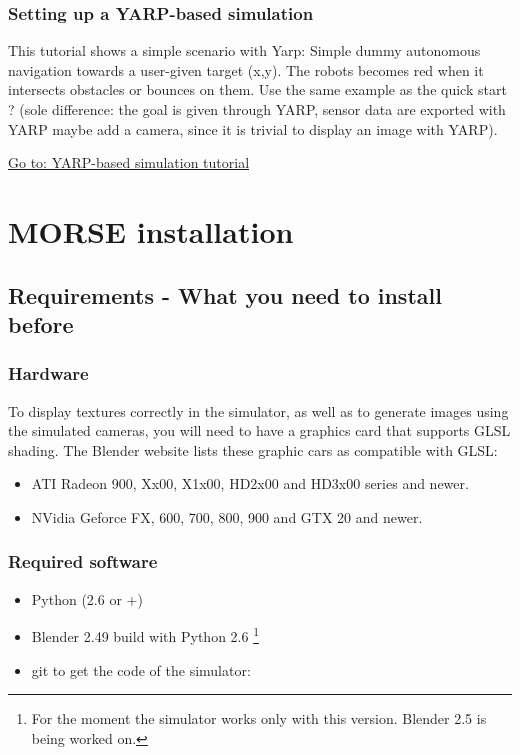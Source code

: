 \documentclass[twoside,a4paper,10pt]{report}
\newcommand{\dokutitlelevelone}[1]{\chapter{#1}}
\newcommand{\dokutitleleveltwo}[1]{\section{#1}}
\newcommand{\dokutitleleveltree}[1]{\subsection{#1}}
\newcommand{\dokufootnote}[1]{\footnote{#1}}
\newcommand{\dokuitem}{\item}
\begin{document}
\dokutitleleveltree{Setting up a YARP-based simulation}
\label{a3bba0b321b28de69351875f85d854db}%

This tutorial shows a simple scenario with Yarp: Simple dummy autonomous navigation towards a user-given target (x,y). 
The robots becomes red when it intersects obstacles or bounces on them. Use the same example as the quick start ? 
(sole difference: the goal is given through YARP, sensor data are exported with YARP  maybe add a camera, since it is trivial to display an image with YARP).

\hyperref[1dd029a60f7f3dd1deaf993ce4538edf]{ Go to: YARP-based simulation tutorial}

\dokutitlelevelone{MORSE installation}
\label{1d96fd68defedd8a755f2a95c80e618f}%
\label{ea09bb364ef1bffd889e76b7a59035fc}%

\dokutitleleveltwo{Requirements - What you need to install before}
\label{27060cbab4a02c4805c03a15b2aad7d7}%

\dokutitleleveltree{Hardware}
\label{3ca14c518d1bf901acc339e7c9cd6d7f}%

To display textures correctly in the simulator, as well as to generate images using the simulated cameras, you will need to have a graphics card that supports GLSL shading. The Blender website lists these graphic cars as compatible with GLSL:


\begin{itemize}
\dokuitem  ATI Radeon 9{\texttimes}00, Xx00, X1x00, HD2x00 and HD3x00 series and newer.
\dokuitem  NVidia Geforce FX, 6{\texttimes}00, 7{\texttimes}00, 8{\texttimes}00, 9{\texttimes}00 and GTX 2{\texttimes}0 and newer.
\end{itemize}

\dokutitleleveltree{Required software}
\label{accfa4c836a5caff827d9adbf6bea7dc}%

\begin{itemize}
\dokuitem  Python (2.6 or +)
\dokuitem  Blender 2.49 build with Python 2.6 \dokufootnote{For the moment the simulator works only with this version. Blender 2.5 is being worked on.}
\dokuitem  git to get the code of the simulator:
\end{itemize}

\small
{}
\normalsize
\end{document}
